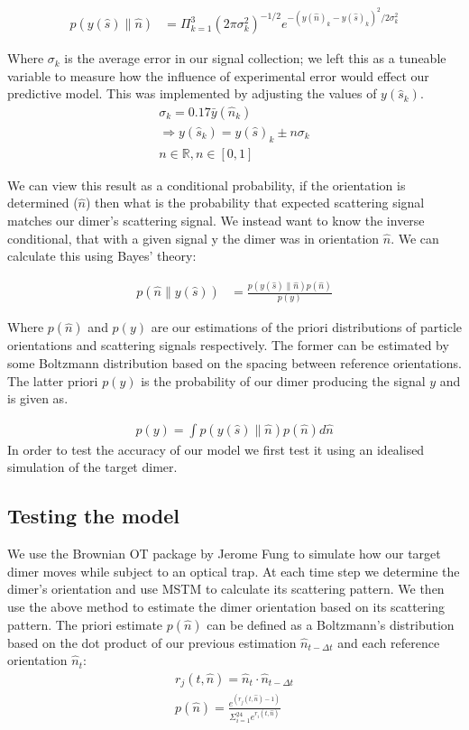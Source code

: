 \documentclass[review,3p]{elsarticle}
\begin{document}
	\begin{eqnarray}
		p(y(\hat{s})\parallel\hat{n})&= \Pi^3_{k=1} 
		(2\pi\sigma_k^2)^{-1/2} e^{-(y(\hat{n})_k-y(\hat{s})_k)^2/2\sigma_k^2}
	\end{eqnarray}

Where $\sigma_k$ is the average error in our signal collection; we left this as a tuneable variable to measure how the influence of experimental error would effect our predictive model. This was implemented by adjusting the values of $y(\hat{s}_k)$. 
\begin{eqnarray}
	\sigma_k = 0.17\bar{y}(\hat{n}_k) \\
	\Rightarrow y(\hat{s}_k) = y(\hat{s})_k \pm n\sigma_k \\ 
	n \in \mathbb{R}, n\in[0,1]
\end{eqnarray}

We can view this result as a conditional probability, if the orientation is determined ($\hat{n}$) then what is the probability that expected scattering signal matches our dimer's scattering signal. We instead want to know the inverse conditional, that with a given signal y the dimer was in orientation $\hat{n}$. We can calculate this using Bayes' theory:

\begin{eqnarray}
	p(\hat{n}\parallel y(\hat{s}))&= \frac{p(y(\hat{s})\parallel\hat{n})p(\hat{n})}{p(y)}
\end{eqnarray}

Where $p(\hat{n})$ and $p(y)$ are our estimations of the priori distributions of particle orientations and scattering signals respectively. The former can be estimated by some Boltzmann distribution based on the spacing between reference orientations. The latter priori $p(y)$ is the probability of our dimer producing the signal $y$ and is given as. 

\begin{eqnarray}
	p(y) = \int p(y(\hat{s})\parallel \hat{n}) p(\hat{n}) d\hat{n}
\end{eqnarray}
In order to test the accuracy of our model we first test it using an idealised simulation of the target dimer. 

\subsection{Testing the model}
\label{2.1}
We use the Brownian OT package by Jerome Fung \cite{Brownian_OT} to simulate how our target dimer moves while subject to an optical trap. At each time step we determine the dimer's orientation and use MSTM to calculate its scattering pattern. We then use the above method to estimate the dimer orientation based on its scattering pattern. The priori estimate $p(\hat{n})$ can be defined as a Boltzmann's distribution based on the dot product of our previous estimation $\hat{n}_{t-\Delta t}$ and each reference orientation $\hat{n}_t$:
\begin{eqnarray}
	r_j(t, \hat{n})= \hat{n}_{t} \cdot \hat{n}_{t-\Delta t} \\
	p(\hat{n})= \frac{e^{(r_j(t,\hat{n})-1)}}
	{\Sigma_{i=1}^{24}e^{r_i(t, \hat{n})}}
\end{eqnarray}
\end{document}
